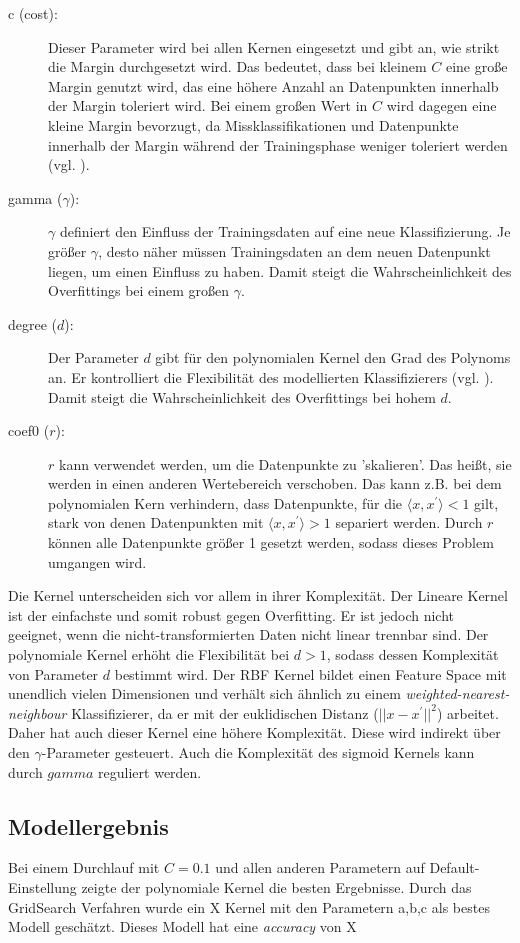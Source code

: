 \begin{description}
	\item[c (cost):]
	Dieser Parameter wird bei allen Kernen eingesetzt und gibt an, wie strikt die Margin durchgesetzt wird. Das bedeutet, dass bei kleinem $C$ eine große Margin genutzt wird, das eine höhere Anzahl an Datenpunkten innerhalb der Margin toleriert wird. Bei einem großen Wert in $C$ wird dagegen eine kleine Margin bevorzugt, da Missklassifikationen und Datenpunkte innerhalb der Margin während der Trainingsphase weniger toleriert werden (vgl. \cite{2015_aggarwal}).
	\item[gamma ($\gamma$):]
	$\gamma$ definiert den Einfluss der Trainingsdaten auf eine neue Klassifizierung. Je größer $\gamma$, desto näher müssen Trainingsdaten an dem neuen Datenpunkt liegen, um einen Einfluss zu haben. Damit steigt die Wahrscheinlichkeit des Overfittings bei einem großen $\gamma$.
	\item[degree ($d$):]
	Der Parameter $d$ gibt für den polynomialen Kernel den Grad des Polynoms an. Er kontrolliert die Flexibilität des modellierten Klassifizierers (vgl. \cite{2009_ben_hur}). Damit steigt die Wahrscheinlichkeit des Overfittings bei hohem $d$.
	\item[coef0 ($r$):]
	$r$ kann verwendet werden, um die Datenpunkte zu 'skalieren'. Das heißt, sie werden in einen anderen Wertebereich verschoben. Das kann z.B. bei dem polynomialen Kern verhindern, dass Datenpunkte, für die $\langle x,x^{'}\rangle<1$ gilt, stark von denen Datenpunkten mit $\langle x,x^{'}\rangle > 1$ separiert werden. Durch $r$ können alle Datenpunkte größer 1 gesetzt werden, sodass dieses Problem umgangen wird.
\end{description}
Die Kernel unterscheiden sich vor allem in ihrer Komplexität. Der Lineare Kernel ist der einfachste und somit robust gegen Overfitting. Er ist jedoch nicht geeignet, wenn die nicht-transformierten Daten nicht linear trennbar sind. Der polynomiale Kernel erhöht die Flexibilität bei $d>1$, sodass dessen Komplexität von Parameter $d$ bestimmt wird. Der RBF Kernel bildet einen Feature Space mit unendlich vielen Dimensionen und verhält sich ähnlich zu einem \emph{weighted-nearest-neighbour} Klassifizierer, da er mit der euklidischen Distanz ($||x-x^{'}||^{2}$) arbeitet. Daher hat auch dieser Kernel eine höhere Komplexität. Diese wird indirekt über den $\gamma$-Parameter gesteuert. Auch die Komplexität des sigmoid Kernels kann durch $gamma$ reguliert werden.
\subsection{Modellergebnis}
Bei einem Durchlauf mit $C=0.1$ und allen anderen Parametern auf Default-Einstellung zeigte der polynomiale Kernel die besten Ergebnisse. Durch das GridSearch Verfahren wurde ein X Kernel mit den Parametern a,b,c als bestes Modell geschätzt. Dieses Modell hat eine \emph{accuracy} von X
